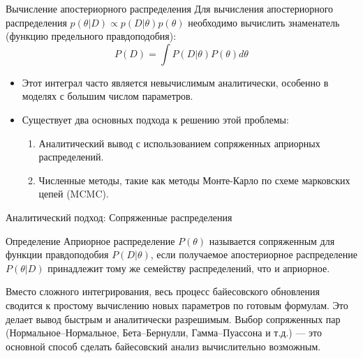 \documentclass[notheorems, handout]{beamer}
\begin{document}
\begin{frame}{Вычисление апостериорного распределения}
    Для вычисления апостериорного распределения $p(\theta|D) \propto p(D|\theta)p(\theta)$ необходимо вычислить знаменатель (функцию предельного правдоподобия):
    \begin{equation*}
        P(D) = \int P(D | \theta) P(\theta) d\theta
    \end{equation*}
    \begin{itemize}
        \item Этот интеграл часто является невычислимым аналитически, особенно в моделях с большим числом параметров.
        \item Существует два основных подхода к решению этой проблемы:
        \begin{enumerate}
            \item Аналитический вывод с использованием сопряженных априорных распределений.
            \item Численные методы, такие как методы Монте-Карло по схеме марковских цепей (MCMC).
        \end{enumerate}
    \end{itemize}
\end{frame}

\begin{frame}{Аналитический подход: Сопряженные распределения}
    \begin{block}{Определение}
Априорное распределение $P(\theta)$ называется сопряженным для функции правдоподобия $P(D|\theta)$, если получаемое апостериорное распределение $P(\theta|D)$ принадлежит тому же семейству распределений, что и априорное.
\end{block}
Вместо сложного интегрирования, весь процесс байесовского обновления сводится к простому вычислению новых параметров по готовым формулам. Это делает вывод быстрым и аналитически разрешимым. Выбор сопряженных пар (Нормальное--Нормальное, Бета--Бернулли, Гамма--Пуассона и т.д.) --- это основной способ сделать байесовский анализ вычислительно возможным.
   
\end{frame}
\end{document}
